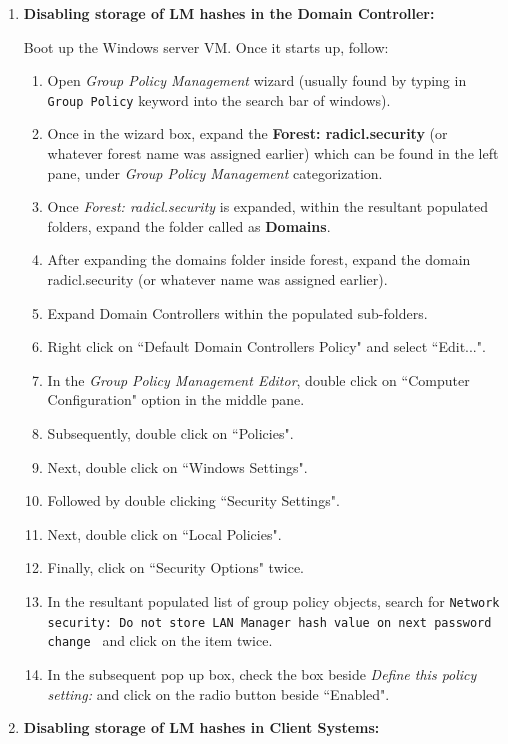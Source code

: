 \documentclass[12pt]{extarticle}
\begin{document}
\begin{enumerate}
	\item \textbf{Disabling storage of LM hashes in the Domain Controller:}
	
	Boot up the Windows server VM. Once it starts up, follow:
	
	\begin{enumerate}
		\item Open \textit{Group Policy Management} wizard (usually found by typing in \texttt{Group Policy} keyword into the search bar of windows).
		\item Once in the wizard box, expand the \textbf{Forest: radicl.security} (or whatever forest name was assigned earlier) which can be found in the left pane, under \textit{Group Policy Management} categorization.
		\item Once \textit{Forest: radicl.security} is expanded, within the resultant populated folders, expand the folder called as \textbf{Domains}.
		\item After expanding the domains folder inside forest, expand the domain radicl.security (or whatever name was assigned earlier).
		\item Expand Domain Controllers within the populated sub-folders.
		\item Right click on ``Default Domain Controllers Policy" and select ``Edit...".
		\item In the \textit{Group Policy Management Editor}, double click on ``Computer Configuration" option in the middle pane.
		\item Subsequently, double click on ``Policies".
		\item Next, double click on ``Windows Settings".
		\item Followed by double clicking ``Security Settings".
		\item Next, double click on ``Local Policies".
		\item Finally, click on ``Security Options" twice.
		\item In the resultant populated list of group policy objects, search for \texttt{Network security: Do not store LAN Manager hash value on next password change } and click on the item twice.
		\item In the subsequent pop up box, check the box beside \textit{Define this policy setting:} and click on the radio button beside ``Enabled". 
	\end{enumerate}
	
	
	
	\item \textbf{Disabling storage of LM hashes in Client Systems:}
	

\end{enumerate}
\end{document}
